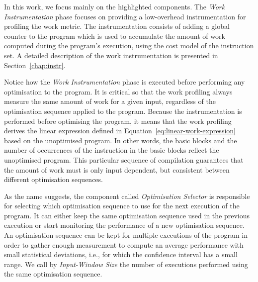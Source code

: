 In this work, we focus mainly on the highlighted components.
The \textit{Work Instrumentation} phase focuses on providing a low-overhead instrumentation for profiling the work metric.
The instrumentation consists of adding a global counter to the program which is used to accumulate the amount of work computed during the program's execution, using the cost model of the instruction set.
A detailed description of the work instrumentation is presented in Section~\ref{chap:instr}.

Notice how the \textit{Work Instrumentation} phase is executed before performing any optimisation to the program.
It is critical so that the work profiling always measure the same amount of work for a given input, regardless of the optimisation sequence applied to the program.
Because the instrumentation is performed before optimising the program, it means that the work profiling derives the linear expression defined in Equation~\ref{eq:linear-work-expression}
based on the unoptimised program.
In other words, the basic blocks and the number of occurrences of the instruction in the basic blocks reflect the unoptimised program.
This particular sequence of compilation guarantees that the amount of work must is only input dependent, but consistent between different optimisation sequences.



As the name suggests, the component called \textit{Optimisation Selector} is responsible for selecting which optimisation sequence to use for the next execution of the program.
It can either keep the same optimisation sequence used in the previous execution or start monitoring the performance of a new optimisation sequence.
An optimisation sequence can be kept for multiple executions of the program in order to gather enough measurement to compute an average performance with small statistical deviations, i.e., for which the confidence interval has a small range.
We call by \textit{Input-Window Size} the number of executions performed using the same optimisation sequence.

